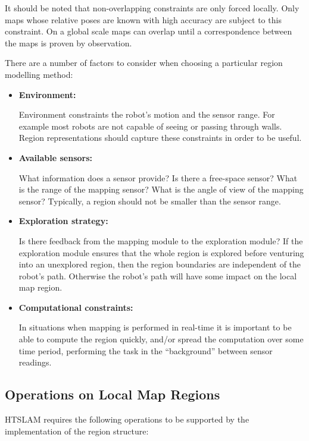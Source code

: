 It should be noted that non-overlapping constraints are only forced
locally. Only maps whose relative poses are known with high accuracy
are subject to this constraint. On a global scale maps can overlap
until a correspondence between the maps is proven by observation.

There are a number of factors to consider when choosing a particular
region modelling method:
\begin{itemize}
  \item \textbf{Environment:}
    
    Environment constraints the robot's motion and the sensor range.
    For example most robots are not capable of seeing or passing
    through walls. Region representations should capture these
    constraints in order to be useful.

  \item \textbf{Available sensors:}
    
    What information does a sensor provide? Is there a free-space sensor?
    What is the range of the mapping sensor? What is the angle of view
    of the mapping sensor? Typically, a region should not be smaller than
    the sensor range.
    
  \item \textbf{Exploration strategy:} 
    
    Is there feedback from the mapping module to the exploration
    module?  If the exploration module ensures that the whole region
    is explored before venturing into an unexplored region, then the
    region boundaries are independent of the robot's path. Otherwise
    the robot's path will have some impact on the local map region.

  \item \textbf{Computational constraints:}
    
    In situations when mapping is performed in real-time it is
    important to be able to compute the region quickly, and/or spread
    the computation over some time period, performing the task in the
    ``background'' between sensor readings.

\end{itemize}

\subsection{Operations on Local Map Regions}

HTSLAM requires the following operations to be supported by the
implementation of the region structure:

